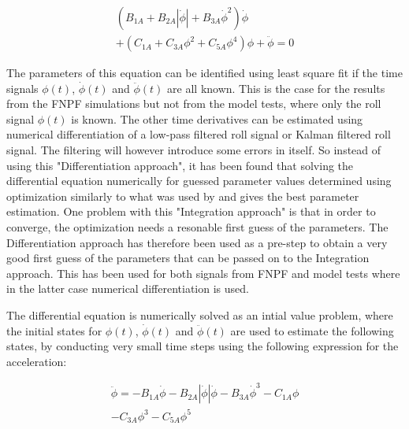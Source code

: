            
    
    \begin{equation}
\begin{aligned}
\left(B_{1A} + B_{2A} \left|{\dot{\phi}}\right| + B_{3A} \dot{\phi}^{2}\right) \dot{\phi} \\ + \left(C_{1A} + C_{3A} \phi^{2} + C_{5A} \phi^{4}\right) \phi + \ddot{\phi} = 0
\end{aligned}
\label{eq:roll_decay_equation_cubic_A}
\end{equation}

    

    The parameters of this equation can be identified using least square fit
if the time signals $\phi(t)$, $\dot{\phi}(t)$ and
$\ddot{\phi}(t)$ are all known. This is the case for the results from
the FNPF simulations but not from the model tests, where only the roll
signal $\phi(t)$ is known. The other time derivatives can be estimated
using numerical differentiation of a low-pass filtered roll signal or
Kalman filtered roll signal. The filtering will however introduce some
errors in itself. So instead of using this "Differentiation approach",
it has been found that solving the differential equation numerically for
guessed parameter values determined using optimization similarly to what
was used by \citep{7505983/FJHQJJUH} and \citep{7505983/24TNAV5Z} gives
the best parameter estimation. One problem with this "Integration
approach" is that in order to converge, the optimization needs a
resonable first guess of the parameters. The Differentiation approach
has therefore been used as a pre-step to obtain a very good first guess
of the parameters that can be passed on to the Integration approach.
This has been used for both signals from FNPF and model tests where in
the latter case numerical differentiation is used.

The differential equation is numerically solved as an intial value
problem, where the initial states for $\phi(t)$, $\dot{\phi}(t)$ and
$\ddot{\phi}(t)$ are used to estimate the following states, by
conducting very small time steps using the following expression for the
acceleration:
 
            
    
    \begin{equation}
\begin{aligned}
\ddot{\phi} = - B_{1A} \dot{\phi} - B_{2A} \left|{\dot{\phi}}\right| \dot{\phi} - B_{3A} \dot{\phi}^{3} - C_{1A} \phi \\ - C_{3A} \phi^{3} - C_{5A} \phi^{5}
\end{aligned}
\label{eq:eq_phi1d}
\end{equation}

